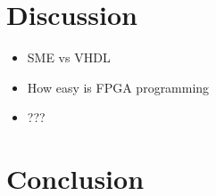 \documentclass[a4paper]{article}
\begin{document}
\section{Discussion}
\label{sec:org6e9eaf1}
\begin{itemize}
\item SME vs VHDL
\item How easy is FPGA programming
\item ???
\end{itemize}

\section{Conclusion}
\label{sec:org193e339}



\end{document}
